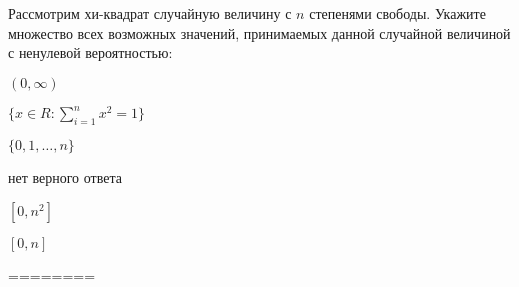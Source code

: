 
\begin{question}
Рассмотрим хи-квадрат случайную величину с \(n\) степенями свободы.
Укажите множество всех возможных значений, принимаемых данной случайной
величиной с ненулевой вероятностью:
\begin{answerlist}
  \item \((0, \infty)\)
  \item \(\{x\in R:\sum_{i=1}^{n}{x_{{}}^{2}}=1\}\)
  \item \(\{0, 1, \ldots, n\}\)
  \item нет верного ответа
  \item \([0,n^2]\)
  \item \([0,n]\)
\end{answerlist}
\end{question}

\begin{solution}
========
\end{solution}


